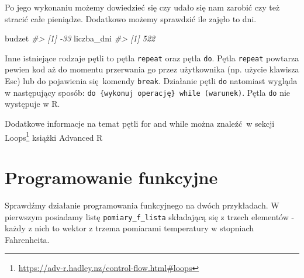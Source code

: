 \documentclass[paper=6in:9in,pagesize=pdftex,headinclude=on,footinclude=on,10pt]{scrbook}
\makeatletter
\newenvironment{Shaded}{\begin{snugshade}}{\end{snugshade}}
\newcommand{\CommentTok}[1]{\textcolor[rgb]{0.56,0.35,0.01}{\textit{#1}}}
\newcommand{\DataTypeTok}[1]{\textcolor[rgb]{0.13,0.29,0.53}{#1}}
\newcommand{\DecValTok}[1]{\textcolor[rgb]{0.00,0.00,0.81}{#1}}
\newcommand{\KeywordTok}[1]{\textcolor[rgb]{0.13,0.29,0.53}{\textbf{#1}}}
\newcommand{\NormalTok}[1]{#1}
\newcommand{\StringTok}[1]{\textcolor[rgb]{0.31,0.60,0.02}{#1}}
\DeclareRobustCommand{\href}[2]{#2\footnote{\url{#1}}}
\newenvironment{kframe}{%
\medskip{}
\setlength{\fboxsep}{.8em}
 \def\at@end@of@kframe{}%
 \ifinner\ifhmode%
  \def\at@end@of@kframe{\end{minipage}}%
  \begin{minipage}{\columnwidth}%
 \fi\fi%
 \def\FrameCommand##1{\hskip\@totalleftmargin \hskip-\fboxsep
 \colorbox{shadecolor}{##1}\hskip-\fboxsep
     \hskip-\linewidth \hskip-\@totalleftmargin \hskip\columnwidth}%
 \MakeFramed {\advance\hsize-\width
   \@totalleftmargin\z@ \linewidth\hsize
   \@setminipage}}%
 {\par\unskip\endMakeFramed%
 \at@end@of@kframe}
\newenvironment{rmdblock}[1]
  {
  \begin{itemize}
  \renewcommand{\labelitemi}{
    \raisebox{-.7\height}[0pt][0pt]{
      {\setkeys{Gin}{width=3em,keepaspectratio}\texttt{[image: images/\#1]}}
    }
  }
  \setlength{\fboxsep}{1em}
  \begin{kframe}
  \item
  }
  {
  \end{kframe}
  \end{itemize}
  }
\newenvironment{rmdinfo}
  {\begin{rmdblock}{compass}}
  {\end{rmdblock}}
\makeatother
\begin{document}
Po jego wykonaniu możemy dowiedzieć się czy udało się nam zarobić czy też stracić całe pieniądze.
Dodatkowo możemy sprawdzić ile zajęło to dni.

\begin{Shaded}
\begin{Highlighting}[]
\NormalTok{budzet}
\CommentTok{#> [1] -33}
\NormalTok{liczba_dni}
\CommentTok{#> [1] 522}
\end{Highlighting}
\end{Shaded}

\begin{rmdinfo}
Inne istniejące rodzaje pętli to pętla \texttt{repeat} oraz pętla \texttt{do}.
Pętla \texttt{repeat} powtarza pewien kod aż do momentu przerwania go przez użytkownika (np. użycie klawisza Esc) lub do pojawienia się~komendy \texttt{break}.
Działanie pętli \texttt{do} natomiast wygląda w następujący sposób:
\texttt{do\ \{wykonuj\ operację\}\ while\ (warunek)}.
Pętla \texttt{do} nie występuje w R.
\end{rmdinfo}

Dodatkowe informacje na temat pętli for and while można znaleźć~w sekcji \href{https://adv-r.hadley.nz/control-flow.html\#loops}{Loops} książki Advanced R \citep{wickham2014advanced}

\hypertarget{prog-fun}{%
\section{Programowanie funkcyjne}\label{prog-fun}}

Sprawdźmy działanie programowania funkcyjnego na dwóch przykładach.
W pierwszym posiadamy listę \texttt{pomiary\_f\_lista} składającą się z trzech elementów - każdy z nich to wektor z trzema pomiarami temperatury w stopniach Fahrenheita.

\begin{Shaded}
\end{Shaded}
\end{document}
